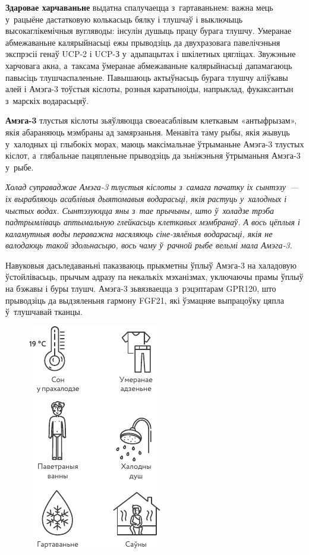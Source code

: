 
\textbf{Здаровае харчаваньне} выдатна спалучаецца з~гартаваньнем: важна мець у~рацыёне дастатковую колькасьць бялку і тлушчаў і выключыць высокаглікемічныя вугляводы: інсулін душыць працу бурага тлушчу. Умеранае абмежаваньне калярыйнасьці ежы прыводзіць да двухразовага павелічэньня экспрэсіі генаў UCP-2 і UCP-З у~адыпацытах і шкілетных цягліцах. Звужэньне харчовага акна, а~таксама ўмеранае абмежаваньне калярыйнасьці дапамагаюць павысіць тлушчаспаленьне. Павышаюць актыўнасьць бурага тлушчу аліўкавы алей і Амэга-3 тоўстыя кіслоты, розныя каратыноіды, напрыклад, фукаксантын з~марскіх водарасьцяў.

\textbf{Амэга-3} тлустыя кіслоты зьяўляюцца своеасаблівым клеткавым «антыфрызам», якія абараняюць мэмбраны ад замярзаньня. Менавіта таму рыбы, якія жывуць у~халодных ці глыбокіх морах, маюць максімальнае ўтрыманьне Амэга-3 тлустых кіслот, а~глябальнае пацяпленьне прыводзіць да зьніжэньня ўтрыманьня Амэга-3 у~рыбе.

\emph{Холад суправаджае Амэга-3 тлустыя кіслоты з~самага пачатку іх сынтэзу~--- іх вырабляюць асаблівыя дыятомавыя водарасьці, якія растуць у~халодных і чыстых водах. Сынтэзуюцца яны з~тае прычыны, што ў~холадзе трэба падтрымліваць аптымальную глейкасьць клеткавых мэмбранаў. А вось цёплыя і каламутныя воды пераважна насяляюць сіне-зялёныя водарасьці, якія не валодаюць такой здольнасьцю, вось чаму ў~рачной рыбе вельмі мала Амэга-3.}

Навуковыя дасьледаваньні паказваюць прыкметны ўплыў Амэга-3 на халадовую ўстойлівасьць, прычым адразу па некалькіх мэханізмах, уключаючы прамы ўплыў на бэжавы і буры тлушч. Амэга-3 зьвязваецца з~рэцэптарам GPR120, што прыводзіць да выдзяленьня гармону FGF21, які ўзмацняе выпрацоўку цяпла ў~тлушчавай тканцы.

\begin{figure}[htb!]
  \centering
  \includegraphics[scale=1.5]{willpower/ch12/5.pdf}
\end{figure}

